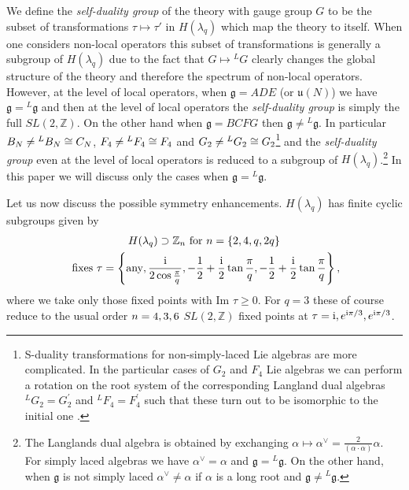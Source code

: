 \documentclass[main.tex]{subfiles}
\begin{document}
We define the \textit{self-duality group} of the theory with gauge group $G$ to be the subset of transformations $\tau\mapsto\tau'$ in $H(\lambda_q)$ which map the theory to itself. When one considers non-local operators this subset of transformations is generally a subgroup of $H(\lambda_q)$ due to the fact that $G\mapsto{}^LG$ clearly changes the global structure of the theory and therefore the spectrum of non-local operators. However, at the level of local operators,    
when $\mathfrak{g}=ADE$ (or $\mathfrak{u}(N)$) we have $\mathfrak{g}={}^L\mathfrak{g}$ and then at the level of local operators the \textit{self-duality group} is simply the full $SL(2,\mathbb{Z})$. On the other hand when $\mathfrak{g}=BCFG$ then $\mathfrak{g}\neq{}^L\mathfrak{g}$. In particular $B_N\neq{}^LB_N\cong C_N$, $F_4\neq{}^LF_4\cong F_4$ and $G_2\neq{}^LG_2\cong G_2$\footnote{S-duality transformations for non-simply-laced Lie algebras are more complicated. In the particular cases of $G_2$ and $F_4$ Lie algebras we can perform a rotation on the root system of the corresponding Langland dual algebras $^{L}G_2 = G_2^{'}$ and $^{L}F_4 = F_{4}^{'}$ such that these turn out to be isomorphic to the initial one \cite{Argyres:2006qr}.} and the \textit{self-duality group} even at the level of local operators is reduced to a subgroup of $H(\lambda_q)$.\footnote{The Langlands dual algebra is obtained by exchanging $\alpha\mapsto\alpha^{\vee}=\frac{2}{(\alpha\cdot\alpha)}\alpha$. For simply laced algebras we have $\alpha^{\vee}=\alpha$ and $\mathfrak{g}={}^L\mathfrak{g}$. On the other hand, when $\mathfrak{g}$ is not simply laced $\alpha^{\vee}\neq\alpha$ if $\alpha$ is a long root and $\mathfrak{g}\neq{}^L\mathfrak{g}$.} In this paper we will discuss only the cases when $\mathfrak{g}={}^L\mathfrak{g}$.

Let us now discuss the possible symmetry enhancements. $H(\lambda_q)$ has finite cyclic subgroups given by
\begin{gather}\label{eqn:taufix}
\text{$H(\lambda_q)\supset \mathbb{Z}_{n}$ for $n=\{2,4,q,2q\}$}\\\text{ fixes $\tau=\left\{\text{any},\frac{\mathrm{i}}{2\cos\frac{\pi}{q}},-\frac{1}{2}+\frac{\mathrm{i}}{2}\tan\frac{\pi}{q},-\frac{1}{2}+\frac{\mathrm{i}}{2}\tan\frac{\pi}{q}\right\}$}\,,
\end{gather}
where we take only those fixed points with $\text{Im }\tau\geq0$. For $q=3$ these of course reduce to the usual order $n=4,3,6$ $SL(2,\mathbb{Z})$ fixed points at $\tau=\mathrm{i},e^{\mathrm{i}\pi/3},e^{\mathrm{i}\pi/3}$.
\end{document}
